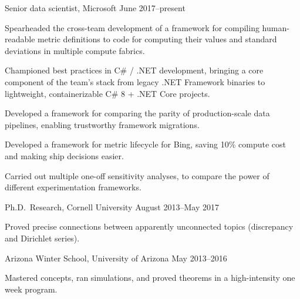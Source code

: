 \documentclass[11pt, letterpaper]{awesome-cv}
\begin{document}
\begin{cventries}

\cventry
  {Senior data scientist, Microsoft}
  {}{}
  {June 2017--present}
  {
    \begin{cvitems}
      \item{Spearheaded the cross-team development of a framework for compiling human-readable metric definitions  to code for computing their values and standard deviations in multiple compute fabrics.}
      \item{Championed best practices in C\# / .NET development, bringing a core component of the team's stack from legacy .NET Framework binaries to lightweight, containerizable C\# 8 + .NET Core projects.}
      \item{Developed a framework for comparing the parity of production-scale data pipelines, enabling trustworthy framework migrations.}
      \item{Developed a framework for metric lifecycle for Bing, saving 10\% compute cost and making ship decisions easier.}
      \item{Carried out multiple one-off sensitivity analyses, to compare the power of different experimentation frameworks.}
    \end{cvitems}
  }

\cventry
  {Ph.D.~Research, Cornell University}
  {}{}
  {August 2013--May 2017}
  {
    \begin{cvitems}
      \item{Proved precise connections between apparently unconnected topics (discrepancy and Dirichlet series).}
    \end{cvitems}
  }

\cventry
  {Arizona Winter School, University of Arizona}
  {}{}
  {May 2013--2016}
  {
    \begin{cvitems}
      \item{Mastered concepts, ran simulations, and proved theorems in a high-intensity one week program.}
    \end{cvitems}
  }
\end{cventries}





\end{document}
